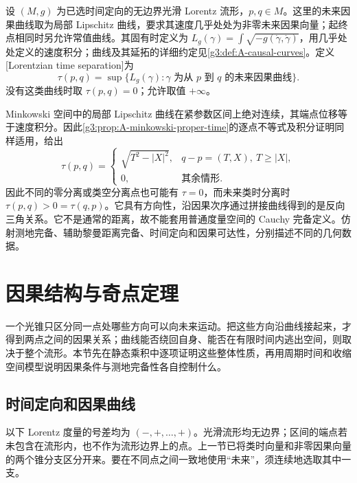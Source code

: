 \begin{definition}\label{g3:def:A-time-separation}
	设 \((M,g)\) 为已选时间定向的无边界光滑 Lorentz 流形，\(p,q\in M\)。这里的未来因果曲线取为局部 Lipschitz 曲线，要求其速度几乎处处为非零未来因果向量；起终点相同时另允许常值曲线。其固有时定义为 \(L_g(\gamma)=\int\sqrt{-g(\dot\gamma,\dot\gamma)}\)，用几乎处处定义的速度积分；曲线及其延拓的详细约定见\cref{g3:def:A-causal-curves}。定义[Lorentzian time separation]为
	\[
		\tau(p,q)=\sup\{L_g(\gamma):
		     \gamma\text{ 为从 }p\text{ 到 }q\text{ 的未来因果曲线}\}.
	\]
	没有这类曲线时取 \(\tau(p,q)=0\)；允许取值 \(+\infty\)。
\end{definition}

Minkowski 空间中的局部 Lipschitz 曲线在紧参数区间上绝对连续，其端点位移等于速度积分。因此\cref{g3:prop:A-minkowski-proper-time}的逐点不等式及积分证明同样适用，给出
\[
	\tau(p,q)=
	\begin{cases}
		\sqrt{T^2-|X|^2},&q-p=(T,X),\ T\ge|X|,\\
		0,&\text{其余情形}.
	\end{cases}
\]
因此不同的零分离或类空分离点也可能有 \(\tau=0\)，而未来类时分离时 \(\tau(p,q)>0=\tau(q,p)\)。它具有方向性，沿因果次序通过拼接曲线得到的是反向三角关系。它不是通常的距离，故不能套用普通度量空间的 Cauchy 完备定义。仿射测地完备、辅助黎曼距离完备、时间定向和因果可达性，分别描述不同的几何数据。

\section{因果结构与奇点定理}
\label{g3:sec:A02}

一个光锥只区分同一点处哪些方向可以向未来运动。把这些方向沿曲线接起来，才得到两点之间的因果关系；曲线能否绕回自身、能否在有限时间内逃出空间，则取决于整个流形。本节先在静态乘积中逐项证明这些整体性质，再用周期时间和收缩空间模型说明因果条件与测地完备性各自控制什么。

\subsection{时间定向和因果曲线}
\label{g3:subsec:A02:01}

以下 Lorentz 度量的号差均为 \((-,+,\ldots,+)\)。光滑流形均无边界；区间的端点若未包含在流形内，也不作为流形边界上的点。上一节已将类时向量和非零因果向量的两个锥分支区分开来。要在不同点之间一致地使用“未来”，须连续地选取其中一支。

